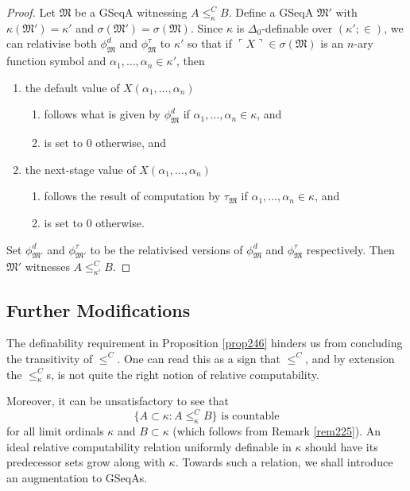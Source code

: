\documentclass[12pt]{article}
\numberwithin{equation}{section}
\begin{document}
\begin{proof}
Let $\mathfrak{M}$ be a GSeqA witnessing $A \leq^C_{\kappa} B$. Define a GSeqA $\mathfrak{M}'$ with $\kappa(\mathfrak{M}') = \kappa'$ and $\sigma(\mathfrak{M}') = \sigma(\mathfrak{M})$. Since $\kappa$ is $\Delta_0$-definable over $(\kappa'; \in)$, we can relativise both $\phi^d_{\mathfrak{M}}$ and $\phi^{\tau}_{\mathfrak{M}}$ to $\kappa'$ so that if $\ulcorner X \urcorner \in \sigma(\mathfrak{M})$ is an $n$-ary function symbol and $\alpha_1, \dots, \alpha_n \in \kappa'$, then 
\begin{enumerate}[label=(\arabic*)]
    \item the default value of $X(\alpha_1, \dots, \alpha_n)$
    \begin{enumerate}[label=(\alph*)]
        \item follows what is given by $\phi^d_{\mathfrak{M}}$ if $\alpha_1, \dots, \alpha_n \in \kappa$, and
        \item is set to $0$ otherwise, and
    \end{enumerate}
    \item the next-stage value of $X(\alpha_1, \dots, \alpha_n)$
    \begin{enumerate}[label=(\alph*)]
        \item follows the result of computation by $\tau_{\mathfrak{M}}$ if $\alpha_1, \dots, \alpha_n \in \kappa$, and
        \item is set to $0$ otherwise.
    \end{enumerate}
\end{enumerate} 
Set $\phi^d_{\mathfrak{M}'}$ and $\phi^{\tau}_{\mathfrak{M}'}$ to be the relativised versions of $\phi^d_{\mathfrak{M}}$ and $\phi^{\tau}_{\mathfrak{M}}$ respectively. Then $\mathfrak{M}'$ witnesses $A \leq^C_{\kappa'} B$.
\end{proof}

\subsection{Further Modifications}\label{ss320}

The definability requirement in Proposition \ref{prop246} hinders us from concluding the transitivity of $\leq^C$. One can read this as a sign that $\leq^C$, and by extension the $\leq^C_{\kappa}$s, is not quite the right notion of relative computability.

Moreover, it can be unsatisfactory to see that
\begin{equation*}
    \{A \subset \kappa : A \leq^C_{\kappa} B\} \text{ is countable}
\end{equation*}
for all limit ordinals $\kappa$ and $B \subset \kappa$ (which follows from Remark \ref{rem225}). An ideal relative computability relation uniformly definable in $\kappa$ should have its predecessor sets grow along with $\kappa$. Towards such a relation, we shall introduce an augmentation to GSeqAs.
\end{document}
